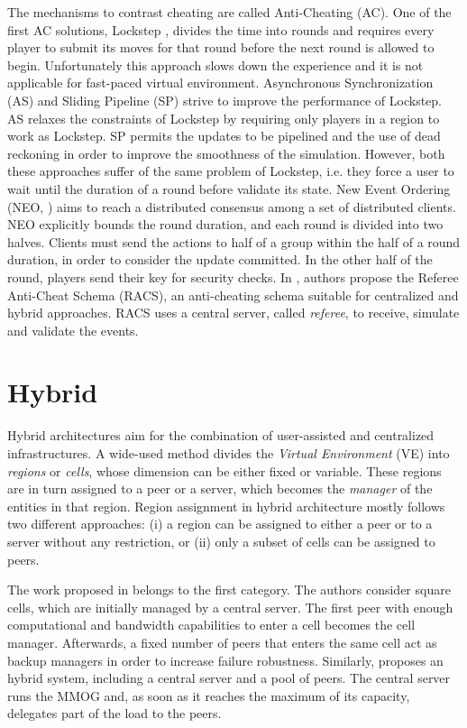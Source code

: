 \documentclass[final,10pt,a5paper]{phdimt}
\theoremstyle{definition}
\begin{document}
The mechanisms to contrast cheating are called Anti-Cheating (AC).
One of the first AC solutions, Lockstep \cite{Baughman2007}, divides the time into rounds and requires every player to submit its moves for that round before the next round is allowed to begin. 
Unfortunately this approach slows down the experience and it is not applicable for fast-paced virtual environment.
Asynchronous Synchronization \cite{Baughman2007} (AS) and Sliding Pipeline \cite{Cronin} (SP) strive to improve the performance of Lockstep. 
AS relaxes the constraints of Lockstep by requiring only players in a region to work as Lockstep. 
SP permits the updates to be pipelined and the use of dead reckoning in order to improve the smoothness of the simulation. However, both these approaches suffer of the same problem of Lockstep, i.e. they force a user to wait until the duration of a round before validate its state.
New Event Ordering (NEO, \cite{Gauthierdickey}) aims to reach a distributed consensus among a set of distributed clients. NEO explicitly bounds the round duration, and each round is divided into two halves. 
Clients must send the actions to half of a group within the half of a round duration, in order to consider the update committed.
In the other half of the round, players send their key for security checks. 
In \cite{Webb}, authors propose the Referee Anti-Cheat Schema (RACS), an anti-cheating schema suitable for centralized and hybrid approaches. RACS uses a central server, called \textit{referee}, to receive, simulate and validate the events. 

\section{Hybrid}
\label{hybrid}

Hybrid architectures aim for the combination of user-assisted and centralized infrastructures. A wide-used method divides the \textit{Virtual Environment} (VE) into \textit{regions} or \textit{cells}, whose dimension can be either fixed or variable. These regions are in turn assigned to a peer or a server, which becomes the \textit{manager} of the entities in that region.
Region assignment in hybrid architecture mostly follows two different approaches: (i) a region can be assigned to either a peer or
to a server without any restriction, or (ii) only a subset of cells can be assigned to peers.

The work proposed in \cite{Kim2004} belongs to the first category. The authors consider square cells, which are initially managed by a central server. The first peer with enough computational and bandwidth capabilities to enter a cell becomes the cell manager. Afterwards,
a fixed number of peers that enters the same cell act as backup managers in order to increase failure robustness. Similarly, \cite{Barri2010} proposes an hybrid system, including a central server and a pool of peers. The central server runs the MMOG and, as soon as it reaches the maximum of its capacity, delegates part of the load to the peers. 
\end{document}
